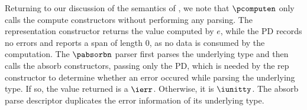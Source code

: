 Returning to our discussion of the semantics of \ddc{}, we note that
$\pcomputen$ only calls the compute constructors without performing
any parsing.  The representation constructor returns the value
computed by $e$, while the PD records no errors and reports a span of
length 0, as no data is consumed by the computation. The $\pabsorbn$
parser first parses the underlying type and then calls the absorb
constructors, passing only the PD, which is needed by the rep
constructor to determine whether an error occured while parsing the
underlying type.  If so, the value returned is a $\ierr$. Otherwise,
it is $\iunitty$.  The absorb parse descriptor duplicates the error
information of its underlying type.

